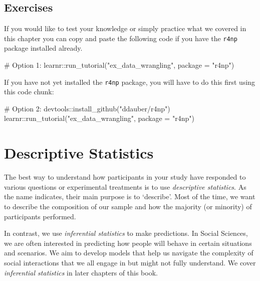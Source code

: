 \documentclass[
  letterpaper,
]{krantz}
\makeatletter
\newenvironment{Shaded}{\begin{snugshade}}{\end{snugshade}}
\newcommand{\AttributeTok}[1]{\textcolor[rgb]{0.40,0.45,0.13}{#1}}
\newcommand{\CommentTok}[1]{\textcolor[rgb]{0.37,0.37,0.37}{#1}}
\newcommand{\FunctionTok}[1]{\textcolor[rgb]{0.28,0.35,0.67}{#1}}
\newcommand{\NormalTok}[1]{\textcolor[rgb]{0.00,0.23,0.31}{#1}}
\newcommand{\SpecialCharTok}[1]{\textcolor[rgb]{0.37,0.37,0.37}{#1}}
\newcommand{\StringTok}[1]{\textcolor[rgb]{0.13,0.47,0.30}{#1}}
\newenvironment{kframe}{%
\medskip{}
\setlength{\fboxsep}{.8em}
 \def\at@end@of@kframe{}%
 \ifinner\ifhmode%
  \def\at@end@of@kframe{\end{minipage}}%
  \begin{minipage}{\columnwidth}%
 \fi\fi%
 \def\FrameCommand##1{\hskip\@totalleftmargin \hskip-\fboxsep
 \colorbox{shadecolor}{##1}\hskip-\fboxsep
     \hskip-\linewidth \hskip-\@totalleftmargin \hskip\columnwidth}%
 \MakeFramed {\advance\hsize-\width
   \@totalleftmargin\z@ \linewidth\hsize
   \@setminipage}}%
 {\par\unskip\endMakeFramed%
 \at@end@of@kframe}
\renewenvironment{Shaded}{\begin{kframe}}{\end{kframe}}
\makeatother
\begin{document}
\section{Exercises}\label{sec-exercises-data-wrangling}

If you would like to test your knowledge or simply practice what we
covered in this chapter you can copy and paste the following code if you
have the \texttt{r4np} package installed already.

\begin{Shaded}
\begin{Highlighting}[]
\CommentTok{\# Option 1:}
\NormalTok{learnr}\SpecialCharTok{::}\FunctionTok{run\_tutorial}\NormalTok{(}\StringTok{"ex\_data\_wrangling"}\NormalTok{, }\AttributeTok{package =} \StringTok{"r4np"}\NormalTok{)}
\end{Highlighting}
\end{Shaded}

If you have not yet installed the \texttt{r4np} package, you will have
to do this first using this code chunk:

\begin{Shaded}
\begin{Highlighting}[]
\CommentTok{\# Option 2:}
\NormalTok{devtools}\SpecialCharTok{::}\FunctionTok{install\_github}\NormalTok{(}\StringTok{"ddauber/r4np"}\NormalTok{)}
\NormalTok{learnr}\SpecialCharTok{::}\FunctionTok{run\_tutorial}\NormalTok{(}\StringTok{"ex\_data\_wrangling"}\NormalTok{, }\AttributeTok{package =} \StringTok{"r4np"}\NormalTok{)}
\end{Highlighting}
\end{Shaded}


\chapter{Descriptive Statistics}\label{sec-descriptive-statistics}

The best way to understand how participants in your study have responded
to various questions or experimental treatments is to use
\emph{descriptive statistics}. As the name indicates, their main purpose
is to `describe'. Most of the time, we want to describe the composition
of our sample and how the majority (or minority) of participants
performed.

In contrast, we use \emph{inferential statistics} to make predictions.
In Social Sciences, we are often interested in predicting how people
will behave in certain situations and scenarios. We aim to develop
models that help us navigate the complexity of social interactions that
we all engage in but might not fully understand. We cover
\emph{inferential statistics} in later chapters of this book.
\end{document}
